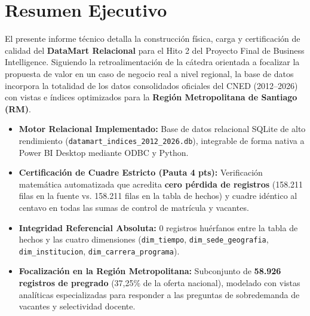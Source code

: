 \documentclass[11pt,a4paper]{article}
\begin{document}
\tableofcontents
\newpage

\section{Resumen Ejecutivo}
El presente informe técnico detalla la construcción física, carga y certificación de calidad del \textbf{DataMart Relacional} para el Hito 2 del Proyecto Final de Business Intelligence. Siguiendo la retroalimentación de la cátedra orientada a focalizar la propuesta de valor en un caso de negocio real a nivel regional, la base de datos incorpora la totalidad de los datos consolidados oficiales del CNED (2012--2026) con vistas e índices optimizados para la \textbf{Región Metropolitana de Santiago (RM)}.

\begin{tcolorbox}[colback=white, colframe=accentteal, title=\textbf{Cuadro Resumen de Cumplimiento Técnico (Hito 2)}]
\begin{itemize}
    \item \textbf{Motor Relacional Implementado:} Base de datos relacional SQLite de alto rendimiento (\texttt{datamart\_indices\_2012\_2026.db}), integrable de forma nativa a Power BI Desktop mediante ODBC y Python.
    \item \textbf{Certificación de Cuadre Estricto (Pauta 4 pts):} Verificación matemática automatizada que acredita \textbf{cero pérdida de registros} (158.211 filas en la fuente vs. 158.211 filas en la tabla de hechos) y cuadre idéntico al centavo en todas las sumas de control de matrícula y vacantes.
    \item \textbf{Integridad Referencial Absoluta:} 0 registros huérfanos entre la tabla de hechos y las cuatro dimensiones (\texttt{dim\_tiempo}, \texttt{dim\_sede\_geografia}, \texttt{dim\_institucion}, \texttt{dim\_carrera\_programa}).
    \item \textbf{Focalización en la Región Metropolitana:} Subconjunto de \textbf{58.926 registros de pregrado} (37,25\% de la oferta nacional), modelado con vistas analíticas especializadas para responder a las preguntas de sobredemanda de vacantes y selectividad docente.
\end{itemize}
\end{tcolorbox}

\end{document}
